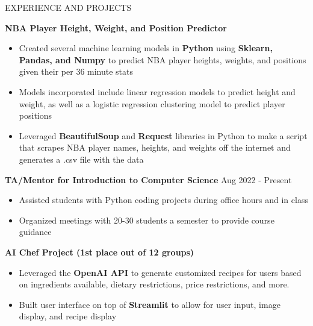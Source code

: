 \documentclass{resume} %
\begin{document}
\begin{rSection}{EXPERIENCE AND PROJECTS}


\item \textbf{NBA Player Height, Weight, and Position Predictor} %
\vspace{-6pt}
 \begin{itemize}
    \itemsep -6pt {} 
     \item Created several machine learning models in \textbf{Python} using \textbf{Sklearn, Pandas, and Numpy} to predict NBA player heights, weights, and positions given their per 36 minute stats
     \item Models incorporated include linear regression models to predict height and weight, as well as a logistic regression clustering model to predict player positions
    \item Leveraged \textbf{BeautifulSoup} and \textbf{Request} libraries in Python to make a script that scrapes NBA player names, heights, and weights off the internet and generates a .csv file with the data
 \end{itemize}



 \textbf{TA/Mentor for Introduction to Computer Science} \hfill Aug 2022 - Present%
\vspace{-6pt}
 \begin{itemize}
    \itemsep -6pt {} 
     \item Assisted students with Python coding projects during office hours and in class
     \item Organized meetings with 20-30 students a semester to provide course guidance
 \end{itemize}

 \textbf{AI Chef Project (1st place out of 12 groups)} \hfill %
\vspace{-6pt}
 \begin{itemize}
    \itemsep -6pt {} 
     \item Leveraged the \textbf{OpenAI API} to generate customized recipes for users based on ingredients available, dietary restrictions, price restrictions, and more.
     \item Built user interface on top of \textbf{Streamlit} to allow for user input, image display, and recipe display
 \end{itemize}
 

\end{rSection}
\end{document}
